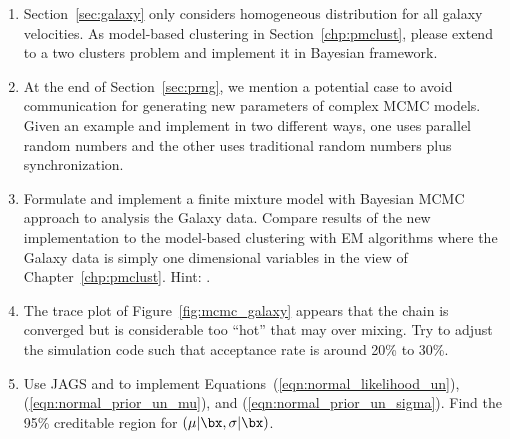 \begin{enumerate}[label=\thechapter-\arabic*]
\item
Section~\ref{sec:galaxy} only considers homogeneous distribution for all
galaxy velocities. As model-based clustering in Section~\ref{chp:pmclust},
please extend to a two clusters problem and implement it in Bayesian
framework.

\item
At the end of Section~\ref{sec:prng}, we mention a potential case to avoid
communication for generating new parameters of complex MCMC models.
Given an example and implement in two different ways, one uses parallel
random numbers and the other uses traditional random numbers plus
synchronization.

\item
Formulate and implement a finite mixture model with Bayesian MCMC approach
to analysis the Galaxy data. Compare results of the new implementation to the
model-based clustering with EM algorithms where the Galaxy data is simply
one dimensional variables in the view of Chapter~\ref{chp:pmclust}.
{\color{blue} Hint: \citet{Marin2007}.}

\item
The trace plot of Figure~\ref{fig:mcmc_galaxy} appears that the chain is
converged but is considerable too ``hot'' that may over mixing. Try to
adjust the simulation code such that acceptance rate is around 20\% to
30\%.

\item
Use JAGS and  to implement
Equations~(\ref{eqn:normal_likelihood_un}),
(\ref{eqn:normal_prior_un_mu}), and (\ref{eqn:normal_prior_un_sigma}).
Find the 95\% creditable region for $(\mu|\bx, \sigma|\bx)$.

\end{enumerate}


